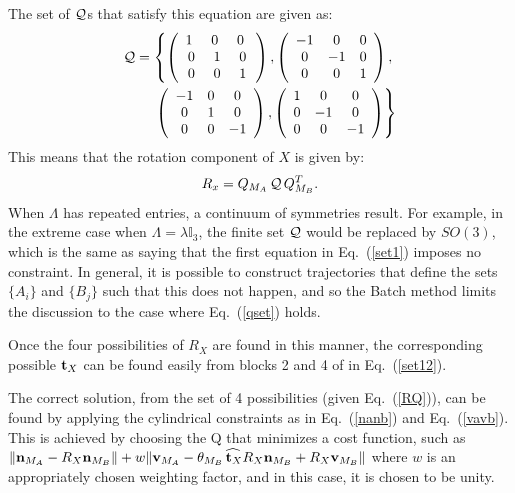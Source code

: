 \documentclass[twocolumn,10pt]{asme2ej}
\begin{document}
The set of ${\cal Q}$s that satisfy this equation are given as:
\begin{equation}
\begin{split}
{\cal Q} = \left\{ \left(\begin{array}{ccc}
1\,\, & 0 \,\, & 0 \,\, \\
0 & 1 & 0\\
0 & 0 & 1 \end{array}\right) , \left(\begin{array}{ccc}
-1 & 0 & 0 \\
0 & -1 & 0\\
0 & 0 & 1 \end{array}\right), \right.\\
\left. \left(\begin{array}{ccc}
-1 & 0 & 0 \\
0 & 1 & 0\\
0 & 0 & -1 \end{array}\right), \left(\begin{array}{ccc}
1 & 0 & 0 \\
0 & -1 & 0\\
0 & 0 & -1 \end{array}\right)\right\}
\end{split} 
\label{qset}
\end{equation}
This means that the rotation component of $X$ is given by:
\begin{equation}
R_x=Q_{M_A}\,{\cal Q}\,Q_{M_B}^T.
\label{RQ}\end{equation}
When $\Lambda$ has repeated entries, a continuum of symmetries result. For example, in the extreme case when $\Lambda = \lambda \mathbb{I}_3$, the
finite set ${\cal Q}$ would be replaced by $SO(3)$, which is the same as saying that the first equation in Eq.~(\ref{set1}) imposes no constraint. In general, it is possible to construct trajectories that define the sets $\{A_i\}$ and $\{B_j\}$ such that this does not happen, and so the Batch method limits the discussion to the case where Eq.~(\ref{qset}) holds.

Once the four possibilities of $R_X$ are found in this manner, the corresponding possible ${\bf t}_X$ can be found easily from blocks 2 and 4 of in Eq.~(\ref{set12}).

The correct solution, from the set of 4 possibilities (given Eq.~(\ref{RQ})), can be found by applying the cylindrical constraints as in Eq.~(\ref{nanb}) and Eq.~(\ref{vavb}). This is achieved by choosing the Q %
that minimizes a cost function, such as $\| {\bf n}_{M_A}-R_X {\bf n}_{M_B} \|+w \| {\bf v}_{M_A} - \theta_{M_B} \widehat{\,{\bf t}_X} R_X {\bf n}_{M_B} + R_X {\bf v}_{M_B} \|$
where $w$ is an appropriately chosen weighting factor, and in this case, it is chosen to be unity.
\end{document}
